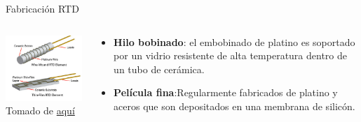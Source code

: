 \documentclass[aspectratio=169]{beamer}
\begin{document}
\begin{frame}{Fabricación RTD}
    \begin{columns}[c, onlytextwidth]
        \begin{column}{0.45\textwidth}
        \includegraphics[width=6.5cm]{fig/rtd_types.jpg}
            \\ \tiny{Tomado de \href{https://www.designworldonline.com/designing-with-rtd-temperature-sensors/}{aquí}}
            
        \end{column}
        \begin{column}{0.55\textwidth}
            \begin{itemize}
                \item \textbf{Hilo bobinado}: el embobinado de platino es soportado por un vidrio resistente de alta temperatura dentro de un tubo de cerámica.     
                \item \textbf{Película fina}:Regularmente fabricados de platino y aceros que son depositados en una membrana de silicón.
            \end{itemize}
        \end{column}
    \end{columns}
\end{frame}
\end{document}
